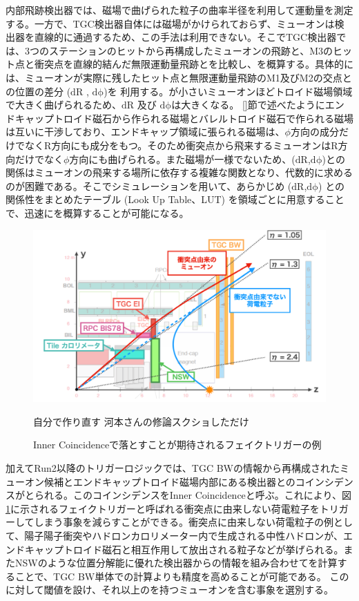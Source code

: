 内部飛跡検出器では、磁場で曲げられた粒子の曲率半径を利用して運動量を測定する。一方で、TGC検出器自体には磁場がかけられておらず、ミューオンは検出器を直線的に通過するため、この手法は利用できない。そこでTGC検出器では、3つのステーションのヒットから再構成したミューオンの飛跡と、M3のヒット点と衝突点を直線的結んだ無限運動量飛跡とを比較し、\pt を概算する。具体的には、ミューオンが実際に残したヒット点と無限運動量飛跡のM1及びM2の交点との位置の差分 ($\mathrm{dR}$ , $\mathrm{d\phi}$)を 利用する。\pt が小さいミューオンほどトロイド磁場領域で大きく曲げられるため、$\mathrm{dR}$ 及び $\mathrm{d\phi}$は大きくなる。
\ref{}節で述べたようにエンドキャップトロイド磁石から作られる磁場とバレルトロイド磁石で作られる磁場は互いに干渉しており、エンドキャップ領域に張られる磁場は、$\phi$方向の成分だけでなくR方向にも成分をもつ。そのため衝突点から飛来するミューオンはR方向だけでなく$\phi$方向にも曲げられる。また磁場が一様でないため、($\mathrm{dR}$,$\mathrm{d\phi}$)と\pt の関係はミューオンの飛来する場所に依存する複雑な関数となり、代数的に求めるのが困難である。そこでシミュレーションを用いて、あらかじめ ($\mathrm{dR}$,$\mathrm{d\phi}$) と\pt の関係性をまとめたテーブル (Look Up Table、LUT) を領域ごとに用意することで、迅速に\pt を概算することが可能になる。

\begin{figure} 
\centering
\includegraphics[width=16cm]{fig/Intro/TGC_Inner_concept.png}
\caption[フェイクトリガーの例]{Inner Coincidenceで落とすことが期待されるフェイクトリガーの例}
\begin{itembox}{自分で作り直す}
    河本さんの修論スクショしただけ
\end{itembox}
\label{TGC_Inner_concept}
\end{figure}

加えてRun2以降のトリガーロジックでは、TGC BWの情報から再構成されたミューオン候補とエンドキャップトロイド磁場内部にある検出器とのコインシデンスがとられる。このコインシデンスをInner Coincidenceと呼ぶ。これにより、図\ref{TGC_Inner_concept}に示されるフェイクトリガーと呼ばれる衝突点に由来しない荷電粒子をトリガーしてしまう事象を減らすことができる。衝突点に由来しない荷電粒子の例として、陽子陽子衝突やハドロンカロリメーター内で生成される中性ハドロンが、エンドキャップトロイド磁石と相互作用して放出される粒子などが挙げられる。またNSWのような位置分解能に優れた検出器からの情報を組み合わせて\pt を計算することで、TGC BW単体での計算よりも精度を高めることが可能である。
この\pt に対して閾値を設け、それ以上の\pt を持つミューオンを含む事象を選別する。

